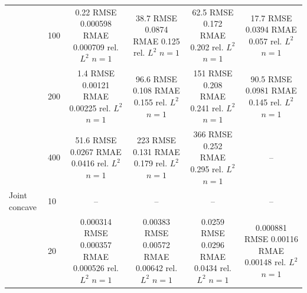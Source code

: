 \begin{tabular}{llcccc}
 & 100 & \shortstack{0.22 RMSE\\0.000598 RMAE\\0.000709 rel. $L^2$\\$n=1$} & \shortstack{38.7 RMSE\\0.0874 RMAE\\0.125 rel. $L^2$\\$n=1$} & \shortstack{62.5 RMSE\\0.172 RMAE\\0.202 rel. $L^2$\\$n=1$} & \shortstack{17.7 RMSE\\0.0394 RMAE\\0.057 rel. $L^2$\\$n=1$} \\
 & 200 & \shortstack{1.4 RMSE\\0.00121 RMAE\\0.00225 rel. $L^2$\\$n=1$} & \shortstack{96.6 RMSE\\0.108 RMAE\\0.155 rel. $L^2$\\$n=1$} & \shortstack{151 RMSE\\0.208 RMAE\\0.241 rel. $L^2$\\$n=1$} & \shortstack{90.5 RMSE\\0.0981 RMAE\\0.145 rel. $L^2$\\$n=1$} \\
 & 400 & \shortstack{51.6 RMSE\\0.0267 RMAE\\0.0416 rel. $L^2$\\$n=1$} & \shortstack{223 RMSE\\0.131 RMAE\\0.179 rel. $L^2$\\$n=1$} & \shortstack{366 RMSE\\0.252 RMAE\\0.295 rel. $L^2$\\$n=1$} & -- \\
\addlinespace
Joint concave & 10 & -- & -- & -- & -- \\
 & 20 & \shortstack{0.000314 RMSE\\0.000357 RMAE\\0.000526 rel. $L^2$\\$n=1$} & \shortstack{0.00383 RMSE\\0.00572 RMAE\\0.00642 rel. $L^2$\\$n=1$} & \shortstack{0.0259 RMSE\\0.0296 RMAE\\0.0434 rel. $L^2$\\$n=1$} & \shortstack{0.000881 RMSE\\0.00116 RMAE\\0.00148 rel. $L^2$\\$n=1$} \\

\end{tabular}
